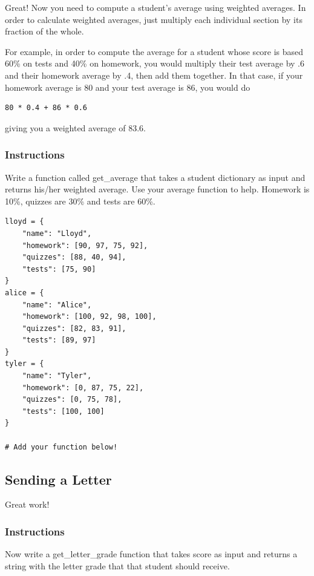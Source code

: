 \documentclass[12pt,a4paper,final,twoside,onecolumn,titlepage]{book}
\begin{document}
Great! Now you need to compute a student’s average using weighted averages. In order to calculate weighted averages, just multiply each individual section by its fraction of the whole.

For example, in order to compute the average for a student whose score is based 60\% on tests and 40\% on homework, you would multiply their test average by .6 and their homework average by .4, then add them together. In that case, if your homework average is 80 and your test average is 86, you would do
\begin{lstlisting}
80 * 0.4 + 86 * 0.6
\end{lstlisting}
giving you a weighted average of 83.6.
\subsubsection{Instructions}

Write a function called get\_average that takes a student dictionary as input and returns his/her weighted average. Use your average function to help. Homework is 10\%, quizzes are 30\% and tests are 60\%.
\begin{lstlisting}
lloyd = {
    "name": "Lloyd",
    "homework": [90, 97, 75, 92],
    "quizzes": [88, 40, 94],
    "tests": [75, 90]
}
alice = {
    "name": "Alice",
    "homework": [100, 92, 98, 100],
    "quizzes": [82, 83, 91],
    "tests": [89, 97]
}
tyler = {
    "name": "Tyler",
    "homework": [0, 87, 75, 22],
    "quizzes": [0, 75, 78],
    "tests": [100, 100]
}

# Add your function below!

\end{lstlisting}
\subsection{Sending a Letter}

Great work!
\subsubsection{Instructions}

Now write a get\_letter\_grade function that takes score as input and returns a string with the letter grade that that student should receive.
\end{document}
